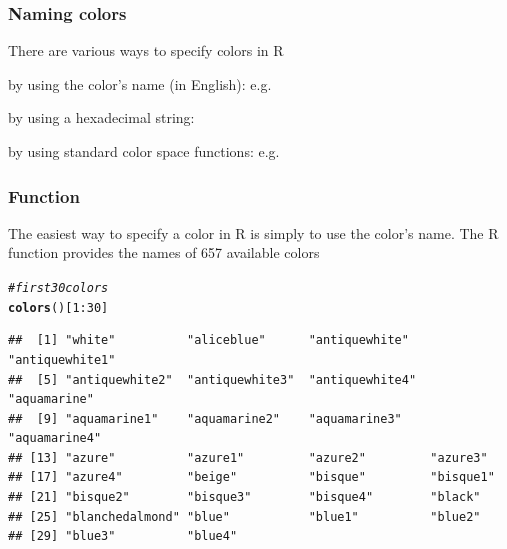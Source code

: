 \documentclass[12pt]{beamer}\usepackage[]{graphicx}\usepackage[]{color}
\makeatletter
\newcommand{\hlnum}[1]{\textcolor[rgb]{0.686,0.059,0.569}{#1}}%
\newcommand{\hlcom}[1]{\textcolor[rgb]{0.678,0.584,0.686}{\textit{#1}}}%
\newcommand{\hlopt}[1]{\textcolor[rgb]{0,0,0}{#1}}%
\newcommand{\hlstd}[1]{\textcolor[rgb]{0.345,0.345,0.345}{#1}}%
\newcommand{\hlkwd}[1]{\textcolor[rgb]{0.737,0.353,0.396}{\textbf{#1}}}%
\newenvironment{kframe}{%
 \def\at@end@of@kframe{}%
 \ifinner\ifhmode%
  \def\at@end@of@kframe{\end{minipage}}%
  \begin{minipage}{\columnwidth}%
 \fi\fi%
 \def\FrameCommand##1{\hskip\@totalleftmargin \hskip-\fboxsep
 \colorbox{shadecolor}{##1}\hskip-\fboxsep
     \hskip-\linewidth \hskip-\@totalleftmargin \hskip\columnwidth}%
 \MakeFramed {\advance\hsize-\width
   \@totalleftmargin\z@ \linewidth\hsize
   \@setminipage}}%
 {\par\unskip\endMakeFramed%
 \at@end@of@kframe}
\newenvironment{knitrout}{}{} %
\makeatother
\begin{document}

\begin{frame}
\begin{center}
\Huge{}
\end{center}
\end{frame}


\begin{frame}
\frametitle{Naming colors}

There are various ways to specify colors in R
 \bi
  \item by using the color's name (in English): e.g. {\hilit {}}
  \item by using a hexadecimal string: {\hilit {}} 
  \item by using standard color space functions: e.g. {\hilit {}}
 \ei
\eb

\end{frame}


\begin{frame}[fragile]
\frametitle{Function }

The easiest way to specify a color in R is simply to use the color's name. The R function {\hilit {}} provides the names of 657 available colors
\begin{knitrout}\scriptsize
{}\color{fgcolor}\begin{kframe}
\begin{alltt}
\hlcom{# first 30 colors}
\hlkwd{colors}\hlstd{()[}\hlnum{1}\hlopt{:}\hlnum{30}\hlstd{]}
\end{alltt}
\begin{verbatim}
##  [1] "white"          "aliceblue"      "antiquewhite"   "antiquewhite1" 
##  [5] "antiquewhite2"  "antiquewhite3"  "antiquewhite4"  "aquamarine"    
##  [9] "aquamarine1"    "aquamarine2"    "aquamarine3"    "aquamarine4"   
## [13] "azure"          "azure1"         "azure2"         "azure3"        
## [17] "azure4"         "beige"          "bisque"         "bisque1"       
## [21] "bisque2"        "bisque3"        "bisque4"        "black"         
## [25] "blanchedalmond" "blue"           "blue1"          "blue2"         
## [29] "blue3"          "blue4"
\end{verbatim}
\end{kframe}
\end{knitrout}

\end{frame}
\end{document}
